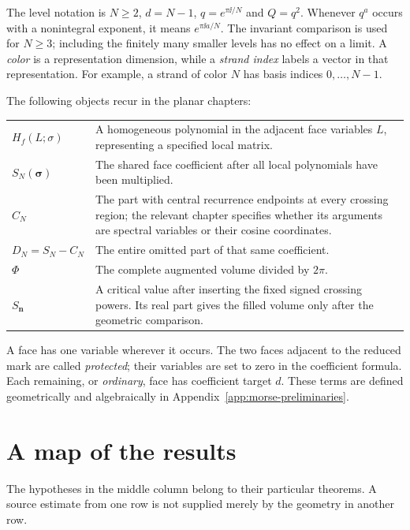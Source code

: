 The level notation is $N\ge2$, $d=N-1$, $q=e^{\pi\ii/N}$ and
$Q=q^2$. Whenever $q^a$ occurs with a nonintegral exponent, it means
$e^{\pi\ii a/N}$. The invariant comparison is used for $N\ge3$;
including the finitely many smaller levels has no effect on a limit.
A \emph{color} is a representation dimension, while a \emph{strand
index} labels a vector in that representation. For example, a strand
of color $N$ has basis indices $0,\ldots,N-1$.

The following objects recur in the planar chapters:
\begin{center}
\begin{tabular}{@{}p{}p{}@{}}
$H_f(L;\sigma)$ & A homogeneous polynomial in the adjacent face
variables $L$, representing a specified local matrix.\\[3pt]
$S_N(\boldsymbol\sigma)$ & The shared face coefficient after all
local polynomials have been multiplied.\\[3pt]
$C_N$ & The part with central recurrence endpoints at every crossing
region; the relevant chapter specifies whether its arguments are
spectral variables or their cosine coordinates.\\[3pt]
$D_N=S_N-C_N$ & The entire omitted part of that same coefficient.\\[3pt]
$\Phi$ & The complete augmented volume divided by $2\pi$.\\[3pt]
$S_{\boldsymbol n}$ & A critical value after inserting the fixed
signed crossing powers. Its real part gives the filled volume only
after the geometric comparison.\\
\end{tabular}
\end{center}
A face has one variable wherever it occurs. The two faces adjacent to
the reduced mark are called \emph{protected}; their variables are set
to zero in the coefficient formula. Each remaining, or \emph{ordinary},
face has coefficient target $d$. These terms are defined geometrically
and algebraically in Appendix~\ref{app:morse-preliminaries}.

\section{A map of the results}

The hypotheses in the middle column belong to their particular
theorems. A source estimate from one row is not supplied merely by
the geometry in another row.

